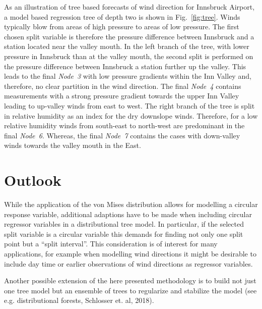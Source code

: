 \documentclass[twoside]{report}
\begin{document}
As an illustration of tree based forecasts of wind direction for Innsbruck Airport, a
model based regression tree of depth two is shown in Fig.~\ref{fig:tree}.
Winds typically blow from areas of high pressure to areas of low pressure. The
first chosen split variable is therefore the pressure difference between
Innsbruck and a station located near the valley mouth. In the left branch of
the tree, with lower pressure in Innsbruck than at the valley mouth, the second
split is performed on the pressure difference between Innsbruck a station
further up the valley. This leads to the final \emph{Node~3} with low pressure
gradients within the Inn Valley and, therefore, no clear partition in the wind
direction. The final \emph{Node~4} contains measurements with a strong pressure
gradient towards the upper Inn Valley leading to up-valley winds from east to
west. The right branch of the tree is split in relative humidity as an index
for the dry downslope winds. Therefore, for a low relative humidity winds from
south-east to north-west are predominant in the final \emph{Node~6}. Whereas,
the final \emph{Node~7} contains the cases with down-valley winds towards the
valley mouth in the East.

\section{Outlook}

While the application of the von Mises distribution allows for modelling a circular response variable,
additional adaptions have to be made when including circular regressor variables in a distributional tree
model. In particular, if the selected split variable is a circular variable this demands for finding
not only one split point but a ``split interval''. This consideration is of interest for many applications,
for example when modelling wind directions it might be desirable to include day time or earlier 
observations of wind directions as regressor variables.

Another possible extension of the here presented methodology is to build not just one tree model but
an ensemble of trees to regularize and stabilize the model 
(see e.g. distributional forests, Schlosser et. al, 2018).



\bigskip



\end{document}
